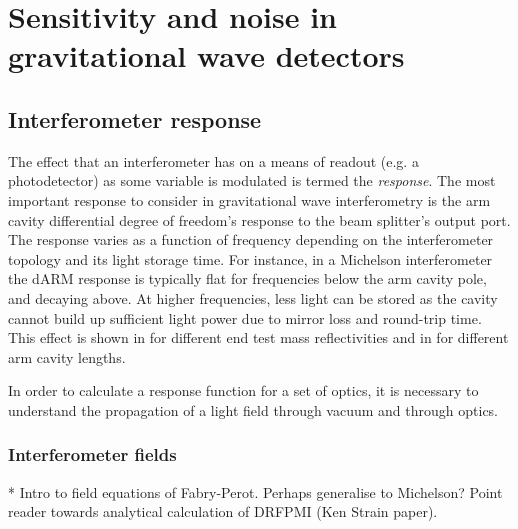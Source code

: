 \chapter{Sensitivity and noise in gravitational wave detectors}
\label{c:instrumentation}

\section{Interferometer response}

The effect that an interferometer has on a means of readout (e.g. a photodetector) as some variable is modulated is termed the \emph{response}. The most important response to consider in gravitational wave interferometry is the arm cavity differential degree of freedom's response to the beam splitter's output port. The response varies as a function of frequency depending on the interferometer topology and its light storage time. For instance, in a Michelson interferometer the dARM response is typically flat for frequencies below the arm cavity pole, and decaying  above. At higher frequencies, less light can be stored as the cavity cannot build up sufficient light power due to mirror loss and round-trip time. This effect is shown in  for different end test mass reflectivities and in  for different arm cavity lengths.

In order to calculate a response function for a set of optics, it is necessary to understand the propagation of a light field through vacuum and through optics.

\subsection{Interferometer fields}
* Intro to field equations of Fabry-Perot. Perhaps generalise to Michelson? Point reader towards analytical calculation of DRFPMI (Ken Strain paper).

